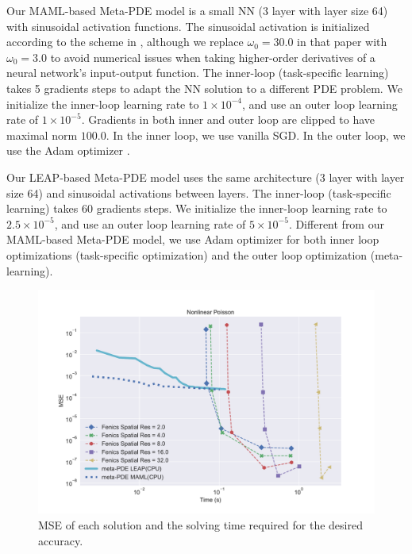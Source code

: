Our MAML-based Meta-PDE model is a small NN (3 layer with layer size 64) with sinusoidal activation functions. The sinusoidal activation is initialized according to the scheme in \citet{sitzmann2020implicit}, although we replace $\omega_0 = 30.0$ in that paper with $\omega_0 = 3.0$ to avoid numerical issues when taking higher-order derivatives of a neural network's input-output function. The inner-loop (task-specific learning) takes 5 gradients steps to adapt the NN solution to a different PDE problem. We initialize the inner-loop learning rate to $1\times 10^{-4}$, and use an outer loop learning rate of $1\times 10^{-5}$. Gradients in both inner and outer loop are clipped to have maximal norm $100.0$. In the inner loop, we use vanilla SGD. In the outer loop, we use the Adam optimizer \citep{kingma2014adam}. 

Our LEAP-based Meta-PDE model uses the same architecture (3 layer with layer size 64) and sinusoidal activations between layers. The inner-loop (task-specific learning) takes 60 gradients steps. We initialize the inner-loop learning rate to $2.5\times 10^{-5}$, and use an outer loop learning rate of $5\times 10^{-5}$. Different from our MAML-based Meta-PDE model, we use  Adam optimizer \citep{kingma2014adam} for both inner loop optimizations (task-specific optimization) and the outer loop optimization (meta-learning).

\begin{figure}
  \centering
\includegraphics[width=\linewidth]{figures/poisson.pdf}
\caption{MSE of each solution and the solving time required for the desired accuracy.}%
\label{fig:poisson_summary}%
\end{figure}

